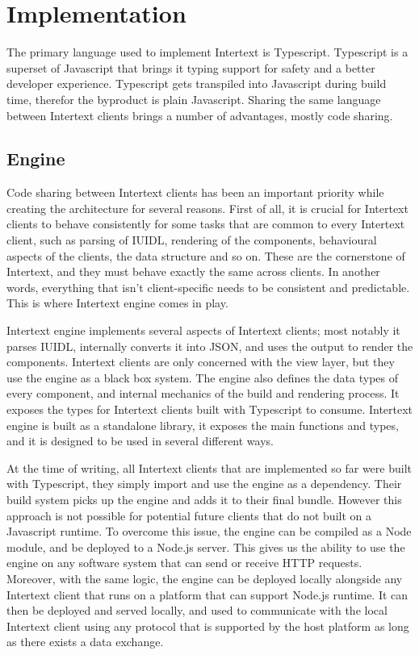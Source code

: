 
\chapter{Implementation} \label{implementation}

The primary language used to implement Intertext is Typescript. Typescript is a superset of Javascript that brings it typing support for safety and a better developer experience. Typescript gets transpiled into Javascript during build time, therefor the byproduct is plain Javascript. Sharing the same language between Intertext clients brings a number of advantages, mostly code sharing.

\section{Engine}

Code sharing between Intertext clients has been an important priority while creating the architecture for several reasons. First of all, it is crucial for Intertext clients to behave consistently for some tasks that are common to every Intertext client, such as parsing of IUIDL, rendering of the components, behavioural aspects of the clients, the data structure and so on. These are the cornerstone of Intertext, and they must behave exactly the same across clients. In another words, everything that isn't client-specific needs to be consistent and predictable. This is where Intertext engine comes in play.

Intertext engine implements several aspects of Intertext clients; most notably it parses IUIDL, internally converts it into JSON, and uses the output to render the components. Intertext clients are only concerned with the view layer, but they use the engine as a black box system. The engine also defines the data types of every component, and internal mechanics of the build and rendering process. It exposes the types for Intertext clients built with Typescript to consume. Intertext engine is built as a standalone library, it exposes the main functions and types, and it is designed to be used in several different ways.

At the time of writing, all Intertext clients that are implemented so far were built with Typescript, they simply import and use the engine as a dependency. Their build system picks up the engine and adds it to their final bundle. However this approach is not possible for potential future clients that do not built on a Javascript runtime. To overcome this issue, the engine can be compiled as a Node module, and be deployed to a Node.js server. This gives us the ability to use the engine on any software system that can send or receive HTTP requests. Moreover, with the same logic, the engine can be deployed locally alongside any Intertext client that runs on a platform that can support Node.js runtime. It can then be deployed and served locally, and used to communicate with the local Intertext client using any protocol that is supported by the host platform as long as there exists a data exchange. 

